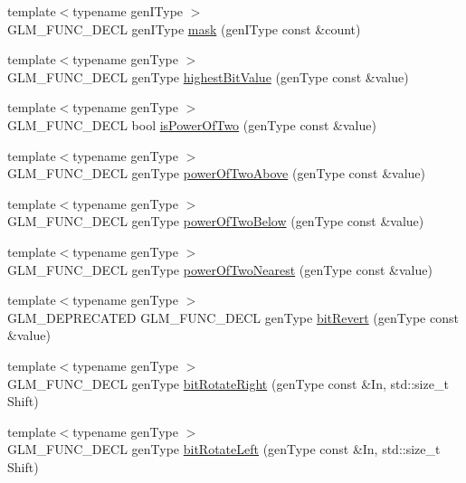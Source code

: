 \begin{DoxyCompactItemize}
\item 
{\footnotesize template$<$typename gen\+I\+Type $>$ }\\G\+L\+M\+\_\+\+F\+U\+N\+C\+\_\+\+D\+E\+CL gen\+I\+Type \hyperlink{group__gtx__bit_ga79f1482a09c91f785e7e0ea8aed2b20e}{mask} (gen\+I\+Type const \&count)
\item 
{\footnotesize template$<$typename gen\+Type $>$ }\\G\+L\+M\+\_\+\+F\+U\+N\+C\+\_\+\+D\+E\+CL gen\+Type \hyperlink{group__gtx__bit_ga9621840252c293918780bc3890374b86}{highest\+Bit\+Value} (gen\+Type const \&value)
\item 
{\footnotesize template$<$typename gen\+Type $>$ }\\G\+L\+M\+\_\+\+F\+U\+N\+C\+\_\+\+D\+E\+CL bool \hyperlink{group__gtx__bit_ga5ddca7546d8be35992eedd3411842545}{is\+Power\+Of\+Two} (gen\+Type const \&value)
\item 
{\footnotesize template$<$typename gen\+Type $>$ }\\G\+L\+M\+\_\+\+F\+U\+N\+C\+\_\+\+D\+E\+CL gen\+Type \hyperlink{group__gtx__bit_gaa49786cf3f8a1f65de6e70b6088a811e}{power\+Of\+Two\+Above} (gen\+Type const \&value)
\item 
{\footnotesize template$<$typename gen\+Type $>$ }\\G\+L\+M\+\_\+\+F\+U\+N\+C\+\_\+\+D\+E\+CL gen\+Type \hyperlink{group__gtx__bit_gaeceaea338213cbff7a275460e35e8d0c}{power\+Of\+Two\+Below} (gen\+Type const \&value)
\item 
{\footnotesize template$<$typename gen\+Type $>$ }\\G\+L\+M\+\_\+\+F\+U\+N\+C\+\_\+\+D\+E\+CL gen\+Type \hyperlink{group__gtx__bit_ga9e68299f4ca0cd6674efbee62d425b95}{power\+Of\+Two\+Nearest} (gen\+Type const \&value)
\item 
{\footnotesize template$<$typename gen\+Type $>$ }\\G\+L\+M\+\_\+\+D\+E\+P\+R\+E\+C\+A\+T\+ED G\+L\+M\+\_\+\+F\+U\+N\+C\+\_\+\+D\+E\+CL gen\+Type \hyperlink{group__gtx__bit_ga2d3939fbf96aa54cb2fd3461a60aba02}{bit\+Revert} (gen\+Type const \&value)
\item 
{\footnotesize template$<$typename gen\+Type $>$ }\\G\+L\+M\+\_\+\+F\+U\+N\+C\+\_\+\+D\+E\+CL gen\+Type \hyperlink{group__gtx__bit_gaf999dbfe97a5be5ea68841a58cf89a4a}{bit\+Rotate\+Right} (gen\+Type const \&In, std\+::size\+\_\+t Shift)
\item 
{\footnotesize template$<$typename gen\+Type $>$ }\\G\+L\+M\+\_\+\+F\+U\+N\+C\+\_\+\+D\+E\+CL gen\+Type \hyperlink{group__gtx__bit_ga32c0a5149152a9aa75afafe81b19be53}{bit\+Rotate\+Left} (gen\+Type const \&In, std\+::size\+\_\+t Shift)

\end{DoxyCompactItemize}
